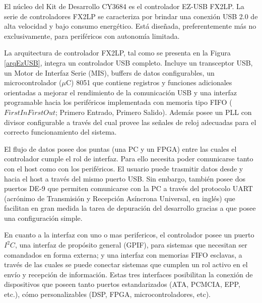 El núcleo del Kit de Desarrollo CY3684 es el controlador EZ-USB FX2LP. La serie de controladores FX2LP se caracteriza por brindar una conexión USB 2.0 de alta velocidad y bajo consumo energético. Está diseñada, preferentemente más no exclusivamente, para periféricos con autonomía limitada.

La arquitectura de controlador FX2LP, tal como se presenta en la Figura \ref{arqEzUSB}, integra un controlador USB completo. Incluye un transceptor USB, un Motor de Interfaz Serie (MIS), buffers de datos configurables, un microcontrolador ($\mu$C) 8051 que contiene registros y funciones adicionales orientadas a mejorar el rendimiento de la comunicación USB y una interfaz programable hacia los periféricos implementada con memoria tipo FIFO (\(First In First Out\); Primero Entrado, Primero Salido). Además posee un PLL con divisor configurable a través del cual provee las señales de reloj adecuadas para el correcto funcionamiento del sistema.%

El flujo de datos posee dos puntas (una PC y un FPGA) entre las cuales el controlador cumple el rol de interfaz. Para ello necesita poder comunicarse tanto con el host como con los periféricos. El usuario puede trasmitir datos desde y hacia el host a través del mismo puerto USB. Sin embargo, también posee dos puertos DE-9 que permiten comunicarse con la PC a través del protocolo UART (acrónimo de Transmisión y Recepción Asíncrona Universal, en inglés) que facilitan en gran medida la tarea de depuración del desarrollo gracias a que posee una configuración simple.

En cuanto a la interfaz con uno o mas perifericos, el controlador posee un puerto $I^2C$, una interfaz de propósito general (GPIF), para sistemas que necesitan ser comandados en forma externa; y una interfaz con memorias FIFO esclavas, a través de las cuales se puede conectar sistemas que cumplen un rol activo en el envío y recepción de información. Estas tres interfaces posibilitan la conexión de dispositivos que poseen tanto puertos estandarizados (ATA, PCMCIA, EPP, etc.), cómo personalizables (DSP, FPGA, microcontroladores, etc).

 
